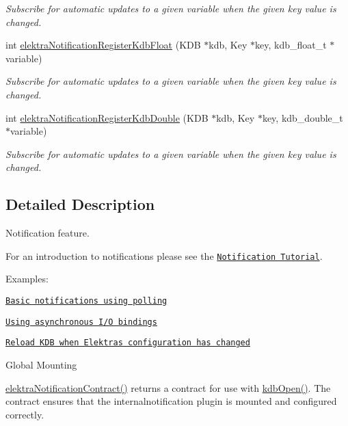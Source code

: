 \begin{DoxyCompactItemize}
\begin{DoxyCompactList}\small\item\em Subscribe for automatic updates to a given variable when the given key value is changed. \end{DoxyCompactList}\item 
int \hyperlink{group__kdbnotification_ga6c83faa92467ece80470e7898dc7d08b}{elektra\+Notification\+Register\+Kdb\+Float} (K\+DB $\ast$kdb, Key $\ast$key, kdb\+\_\+float\+\_\+t $\ast$variable)
\begin{DoxyCompactList}\small\item\em Subscribe for automatic updates to a given variable when the given key value is changed. \end{DoxyCompactList}\item 
int \hyperlink{group__kdbnotification_ga99a142068ed614d7cb8b177e3b6920e4}{elektra\+Notification\+Register\+Kdb\+Double} (K\+DB $\ast$kdb, Key $\ast$key, kdb\+\_\+double\+\_\+t $\ast$variable)
\begin{DoxyCompactList}\small\item\em Subscribe for automatic updates to a given variable when the given key value is changed. \end{DoxyCompactList}\end{DoxyCompactItemize}


\subsection{Detailed Description}
Notification feature. 

For an introduction to notifications please see the \href{doc_tutorials_notifications_md.html}{\tt Notification Tutorial}.

Examples\+:


\begin{DoxyItemize}
\item \href{https://www.libelektra.org/examples/notificationpolling}{\tt Basic notifications using polling}
\item \href{https://www.libelektra.org/examples/notificationasync}{\tt Using asynchronous I/O bindings}
\item \href{https://www.libelektra.org/examples/notificationreload}{\tt Reload K\+DB when Elektra\textquotesingle{}s configuration has changed}
\end{DoxyItemize}

\begin{DoxyParagraph}{Global Mounting}

\end{DoxyParagraph}
\hyperlink{kdbnotification_8h_ad9290f444f315d3eac3f7cfdaf4efcda}{elektra\+Notification\+Contract()} returns a contract for use with \hyperlink{group__kdb_ga844e1299a84c3fbf1d3a905c5c893ba5}{kdb\+Open()}. The contract ensures that the internalnotification plugin is mounted and configured correctly.

